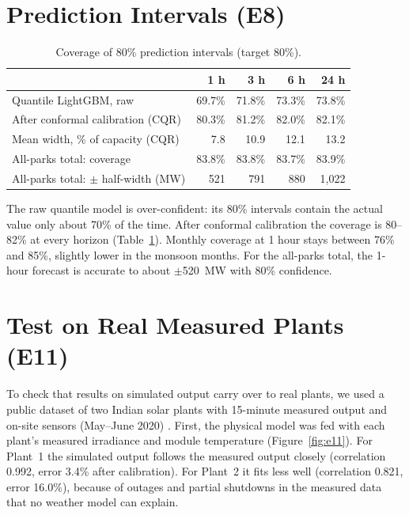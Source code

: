 \documentclass[12pt]{report}
\begin{document}
\section{Prediction Intervals (E8)}
\vspace{1mm}
\begin{table}[htbp]
\centering
\caption{Coverage of 80\% prediction intervals (target 80\%).}
\label{tab:e8}
\begin{tabular}{lrrrr}
\toprule
 & 1 h & 3 h & 6 h & 24 h \\
\midrule
Quantile LightGBM, raw & 69.7\% & 71.8\% & 73.3\% & 73.8\% \\
After conformal calibration (CQR) & 80.3\% & 81.2\% & 82.0\% & 82.1\% \\
Mean width, \% of capacity (CQR) & 7.8 & 10.9 & 12.1 & 13.2 \\
\midrule
All-parks total: coverage & 83.8\% & 83.8\% & 83.7\% & 83.9\% \\
All-parks total: $\pm$ half-width (MW) & 521 & 791 & 880 & 1,022 \\
\bottomrule
\end{tabular}
\end{table}

The raw quantile model is over-confident: its 80\% intervals contain the actual value only about 70\% of the time. After conformal calibration the coverage is 80--82\% at every horizon (Table~\ref{tab:e8}). Monthly coverage at 1 hour stays between 76\% and 85\%, slightly lower in the monsoon months. For the all-parks total, the 1-hour forecast is accurate to about $\pm$520~MW with 80\% confidence.

\section{Test on Real Measured Plants (E11)}
\vspace{1mm}
To check that results on simulated output carry over to real plants, we used a public dataset of two Indian solar plants with 15-minute measured output and on-site sensors (May--June 2020) \cite{kaggleplants}. First, the physical model was fed with each plant's measured irradiance and module temperature (Figure~\ref{fig:e11}). For Plant~1 the simulated output follows the measured output closely (correlation 0.992, error 3.4\% after calibration). For Plant~2 it fits less well (correlation 0.821, error 16.0\%), because of outages and partial shutdowns in the measured data that no weather model can explain.
\end{document}
